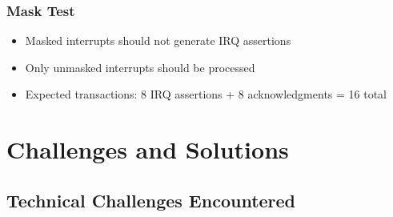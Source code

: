 \documentclass[12pt,a4paper]{article}
\begin{document}
\subsubsection{Mask Test}
\begin{itemize}
    \item Masked interrupts should not generate IRQ assertions
    \item Only unmasked interrupts should be processed
    \item Expected transactions: 8 IRQ assertions + 8 acknowledgments = 16 total
\end{itemize}
\section{Challenges and Solutions}
\subsection{Technical Challenges Encountered}
\end{document}

